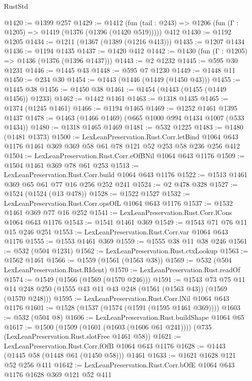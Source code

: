 \begin{lexlean}{RustStd}
\begin{coremodule}
@1420 := @1399 @257
@1429 := @1412
    (fun (tail : @243) => @1206 (fun (Γ : @1205) => @1419 (@1376 (@1396 (@1420 @519)))))
    @412
@1430 := @1192 @1205
@1434 := @1211 (@1367 (@1389 (@1216 @413)))
@1435 := @1207 @1434
@1436 := @1194 @1435
@1437 := @1420 @412
@1442 := @1430 (fun (Γ : @1205) => @1436 (@1376 (@1396 @1437)))
@1443 := @2 @1232
@1445 := @595 @30 @1231
@1446 := @1445 @43
@1448 := @595 @7 @1230
@1449 := @1448 @11
@1450 := @234 @30
@1454 := @1443 (@1446 (@1449 (@1450 @43)))
@1455 := @1445 @38
@1456 := @1450 @38
@1461 := @1454 (@1443 (@1455 (@1449 @1456)) @1233)
@1462 := @1442 @1461
@1463 := @1318 @1435
@1465 := @1374 (@1245 @1461)
@1466 := @1194 @1465
@1469 := @1252 @1461 @1395 @1437
@1478 := @1463 (@1466 @1469) (@665 @1000 @994 @1434 @1007 (@533 @1434))
@1480 := @1318 @1465 @1469
@1481 := @532 @1225
@1483 := @1480 (@1481 @1373)
@1500 := LexLeanPreservation.Rust.Corr.letBind
    @1064
    @643
    @1176
    @1461
    @369
    @369
    @58
    @61
    @78
    @121
    @52
    @253
    @58
    @236
    @256
    @412
@1504 := LexLeanPreservation.Rust.Corr.eOfBNil @1064 @643 @1176
@1509 := @1504 @1461 @369 @78 @61 @253
@1513 := LexLeanPreservation.Rust.Corr.build @1064 @643 @1176
@1522 := @1513 @1461 @369 @65 @61 @77 @16 @256 @252 @241
@1524 := @2 @478 @328
@1527 := @1524 (@1524 (@13 @478))
@1528 := @1522 @1527
@1532 := LexLeanPreservation.Rust.Corr.opsOfL @1064 @643 @1176
@1537 := @1532 @1461 @369 @77 @16 @252
@1541 := LexLeanPreservation.Rust.Corr.lCons @1064 @643 @1176
@1543 := @1541 @1461 @369
@1549 := @1543 @71 @76 @11 @15 @246 @251
@1553 := LexLeanPreservation.Rust.Corr.var @1064 @643 @1176
@1555 := @1553 @1461 @369
@1559 := @1555 @38 @11 @38 @246
@1561 := @532 (@504 @1231)
@1562 := LexLeanPreservation.Rust.ctxLookup
@1563 := @1562 @1461
@1566 := @1559 (@1561 (@1563 @38))
@1569 := @532 (@504 LexLeanPreservation.Rust.RIdent)
@1570 := LexLeanPreservation.Rust.readOf
@1574 := @1549 (@1566 (@1569 (@1570 @246)))
@1591 := @1543
    @73
    @75
    @11
    @14
    @248
    @250
    (@1555 @43 @11 @43 @248 (@1561 (@1563 @43)) (@1569 (@1570 @248)))
@1595 := LexLeanPreservation.Rust.Corr.lNil @1064 @643 @1176
@1601 := @1528 (@1537 (@1574 (@1591 (@1595 @1461 @369))))
@1603 := @532 (@504 @8)
@1606 := LexLeanPreservation.Rust.buildShape @1064 @65
@1617 := @1500
    (@1509 (@1601 (@1603 (@1606 @61 @241))))
    (@735 (LexLeanPreservation.Rust.slotFree @1461 @58))
@1621 := LexLeanPreservation.Rust.Corr.fOfB @1064 @643 @1176
@1628 := @1443 (@1445 @58 (@1448 @61 (@1450 @58))) @1461
@1633 := @1621 @1628 @121 @52 @256 @411
@1642 := LexLeanPreservation.Rust.Corr.bOfE @1064 @643 @1176 @1628 @369 @121 @52 @411

\end{coremodule}
\end{lexlean}
